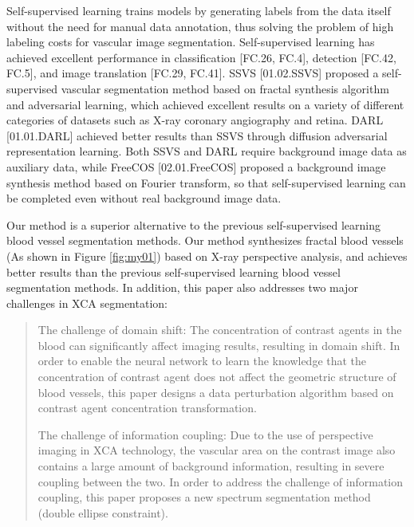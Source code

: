 Self-supervised learning trains models by generating labels from the data itself without the need for manual data annotation, thus solving the problem of high labeling costs for vascular image segmentation. Self-supervised learning has achieved excellent performance in classification [FC.26, FC.4], detection [FC.42, FC.5], and image translation [FC.29, FC.41]. SSVS [01.02.SSVS] proposed a self-supervised vascular segmentation method based on fractal synthesis algorithm and adversarial learning, which achieved excellent results on a variety of different categories of datasets such as X-ray coronary angiography and retina. DARL [01.01.DARL] achieved better results than SSVS through diffusion adversarial representation learning. Both SSVS and DARL require background image data as auxiliary data, while FreeCOS [02.01.FreeCOS] proposed a background image synthesis method based on Fourier transform, so that self-supervised learning can be completed even without real background image data.

Our method is a superior alternative to the previous self-supervised learning blood vessel segmentation methods. 
Our method synthesizes fractal blood vessels (As shown in Figure \cref{fig:my01}) based on X-ray perspective analysis, 
and achieves better results than the previous self-supervised learning blood vessel segmentation methods. 
In addition, this paper also addresses two major challenges in XCA segmentation:
\begin{quotation}
  \noindent
The challenge of domain shift: The concentration of contrast agents in the blood can significantly affect imaging results, resulting in domain shift. In order to enable the neural network to learn the knowledge that the concentration of contrast agent does not affect the geometric structure of blood vessels, this paper designs a data perturbation algorithm based on contrast agent concentration transformation.

The challenge of information coupling: Due to the use of perspective imaging in XCA technology, the vascular area on the contrast image also contains a large amount of background information, resulting in severe coupling between the two. In order to address the challenge of information coupling, this paper proposes a new spectrum segmentation method (double ellipse constraint).
  \end{quotation}
  

